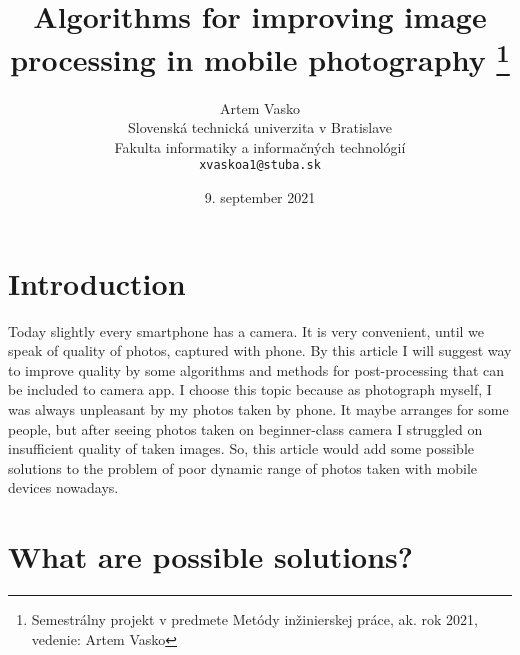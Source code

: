\documentclass[10pt,twoside,english,a4paper]{article}
\title{Algorithms for improving image processing in mobile photography \thanks{Semestrálny projekt v predmete Metódy inžinierskej práce, ak. rok 2021, vedenie: Artem Vasko}} %
\author{Artem Vasko\\[2pt]
	{\small Slovenská technická univerzita v Bratislave}\\
	{\small Fakulta informatiky a informačných technológií}\\
	{\small \texttt{xvaskoa1@stuba.sk}}
	}
\date{\small 9. september 2021} %
\begin{document}
\maketitle





\section{Introduction}

Today slightly every smartphone has a camera. It is very convenient, 
until we speak of quality of photos, captured with phone.
By this article I will suggest way to improve quality by some algorithms and
methods for post-processing that can be included to camera
app. I choose this topic because as photograph myself, I was always
unpleasant by my photos taken by phone. It maybe arranges for some people,
but after seeing photos taken on beginner-class camera I struggled on
insufficient quality of taken images. So, this article would add some
possible solutions to the problem of poor dynamic range of photos
taken with mobile devices nowadays.



\section{What are possible solutions?} \label{nejaka}
\end{document}
